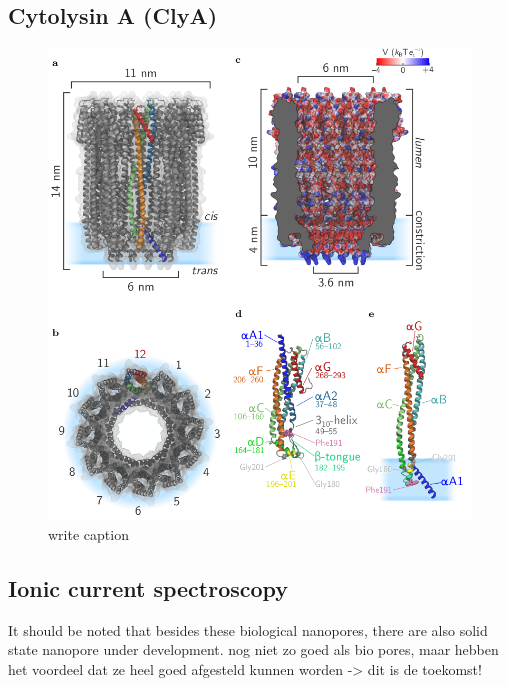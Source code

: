 \subsection{Cytolysin A (ClyA)}
\begin{figure}[h!]
  \centering
  \includegraphics[width=0.5\linewidth]{Figures/cytolysinA.png}
  \caption{write caption}
  \label{adassf}
\end{figure}
\subsection{Ionic current spectroscopy}

It should be noted that besides these biological nanopores, there are also solid state
nanopore under development. nog niet zo goed als bio pores, maar hebben het voordeel dat
ze heel goed afgesteld kunnen worden -> dit is de toekomst!
